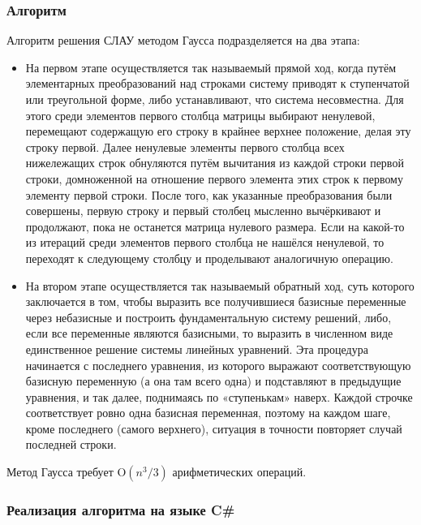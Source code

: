 \documentclass[a4paper]{article}
\begin{document}
\subsubsection{Алгоритм}

Алгоритм решения СЛАУ методом Гаусса подразделяется на два этапа:
\begin{itemize}
 \item На первом этапе осуществляется так называемый прямой ход, когда путём элементарных преобразований над строками систему приводят к ступенчатой или треугольной форме, либо устанавливают, что система несовместна. Для этого среди элементов первого столбца матрицы выбирают ненулевой, перемещают содержащую его строку в крайнее верхнее положение, делая эту строку первой. Далее ненулевые элементы первого столбца всех нижележащих строк обнуляются путём вычитания из каждой строки первой строки, домноженной на отношение первого элемента этих строк к первому элементу первой строки. После того, как указанные преобразования были совершены, первую строку и первый столбец мысленно вычёркивают и продолжают, пока не останется матрица нулевого размера. Если на какой-то из итераций среди элементов первого столбца не нашёлся ненулевой, то переходят к следующему столбцу и проделывают аналогичную операцию.

 \item На втором этапе осуществляется так называемый обратный ход, суть которого заключается в том, чтобы выразить все получившиеся базисные переменные через небазисные и построить фундаментальную систему решений, либо, если все переменные являются базисными, то выразить в численном виде единственное решение системы линейных уравнений. Эта процедура начинается с последнего уравнения, из которого выражают соответствующую базисную переменную (а она там всего одна) и подставляют в предыдущие уравнения, и так далее, поднимаясь по «ступенькам» наверх. Каждой строчке соответствует ровно одна базисная переменная, поэтому на каждом шаге, кроме последнего (самого верхнего), ситуация в точности повторяет случай последней строки.
\end{itemize}

Метод Гаусса требует $\mathrm{O}(n^3 / 3)$ арифметических операций.

\subsubsection{Реализация алгоритма на языке C\#}


\end{document}
